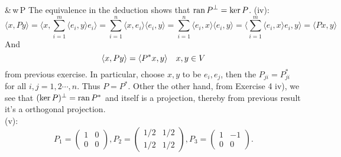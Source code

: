 \documentclass[12pt]{article}
\def\dotp#1#2{\langle#1,#2\rangle}
\def\ss#1#2{\sum_{#1=1}^{#2}}
\def\inn#1#2{(#1): #2\\[0.5em]}
\def\ran#1{{\rm ran}\,#1}
\def\ker#1{{\rm ker}\,#1}
\newcommand{\mm}[1]{\begin{pmatrix}#1\end{pmatrix}}
\begin{document}
{{{	\iff&\,w\in\ker{P}
	}
	The equivalence in the deduction shows that ${\ran P}^{\perp}=\ker{P}$.
	}
	\inn{iv}{
	\[
	\dotp{x}{Py}=\dotp{x}{\ss{i}{m}\dotp{e_i}{y}e_i}=\ss{i}{n}\dotp{x}{e_i}\dotp{e_i}{y}=\ss{i}{n}\dotp{e_i}{x}\dotp{e_i}{y}=\dotp{\ss{i}{m}\dotp{e_i}{x}e_i}{y}=\dotp{Px}{y}
	\]
	And
	\[
	\dotp{x}{Py}=\dotp{P^*x}{y}\quad\hbox{$x,y\in V$}
	\]
	from previous exercise. In particular, choose $x,y$ to be $e_i,e_j$, then the $P_{ji}=P^*_{ji}$ for all $i,j=1,2\cdots,n$. Thus $P=P^*$.
	Other the other hand, from Exercise 4 iv), we see that $(\ker P)^{\perp}=\ran P^*$ and itself is a projection, thereby from previous result it's a orthogonal projection.
	}
	\inn{v}{
	\[
	P_1=\mm{1&0\\0&0},P_2=\mm{1/2&1/2\\1/2&1/2},P_3=\mm{1&-1\\0&0}.
	\]
	}
}
\end{document}
